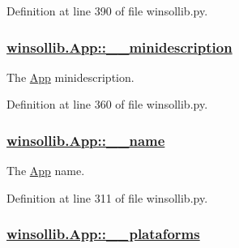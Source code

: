 Definition at line 390 of file winsollib.py.\hypertarget{classwinsollib_1_1App_5387bab0522347c6e1d83469f8629c3c}{
\subsubsection[\_\-\_\-minidescription]{\setlength{\rightskip}{0pt plus 5cm}\hyperlink{classwinsollib_1_1App_5387bab0522347c6e1d83469f8629c3c}{winsollib.App::\_\-\_\-minidescription}}}
\label{classwinsollib_1_1App_5387bab0522347c6e1d83469f8629c3c}


The \hyperlink{classwinsollib_1_1App}{App} minidescription. 



Definition at line 360 of file winsollib.py.\hypertarget{classwinsollib_1_1App_c56363d9474206472085a1deed0bb2d5}{
\subsubsection[\_\-\_\-name]{\setlength{\rightskip}{0pt plus 5cm}\hyperlink{classwinsollib_1_1App_c56363d9474206472085a1deed0bb2d5}{winsollib.App::\_\-\_\-name}}}
\label{classwinsollib_1_1App_c56363d9474206472085a1deed0bb2d5}


The \hyperlink{classwinsollib_1_1App}{App} name. 



Definition at line 311 of file winsollib.py.\hypertarget{classwinsollib_1_1App_8285d15c71e3dfe2099d89fdc915413a}{
\subsubsection[\_\-\_\-plataforms]{\setlength{\rightskip}{0pt plus 5cm}\hyperlink{classwinsollib_1_1App_8285d15c71e3dfe2099d89fdc915413a}{winsollib.App::\_\-\_\-plataforms}}}
\label{classwinsollib_1_1App_8285d15c71e3dfe2099d89fdc915413a}


